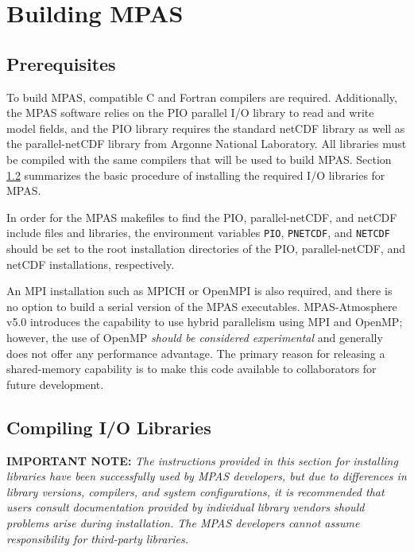 \chapter{Building MPAS}
\label{chap:mpas_build_instructions}

\section{Prerequisites}
\label{build_prerequisites}

To build MPAS, compatible C and Fortran compilers are required. Additionally,
the MPAS software relies on the PIO parallel I/O library to read and write model
fields, and the PIO library requires the standard netCDF library as well as the
parallel-netCDF library from Argonne National Laboratory. All libraries must be
compiled with the same compilers that will be used to build MPAS. Section
\ref{sec:build_io} summarizes the basic procedure of installing the required I/O
libraries for MPAS.

In order for the MPAS makefiles to find the PIO, parallel-netCDF, and netCDF
include files and libraries, the environment variables {\tt PIO}, {\tt PNETCDF},
and {\tt NETCDF} should be set to the root installation directories of the PIO,
parallel-netCDF, and netCDF installations, respectively. 

An MPI installation such as MPICH or OpenMPI is also required, and there is no
option to build a serial version of the MPAS executables. MPAS-Atmosphere v5.0
introduces the capability to use hybrid parallelism using MPI and OpenMP; however,
the use of OpenMP {\em should be considered experimental} and generally does not
offer any performance advantage. The primary reason for releasing a shared-memory
capability is to make this code available to collaborators for future development.


\section{Compiling I/O Libraries}
\label{sec:build_io}

{\bf IMPORTANT NOTE:} {\em The instructions provided in this section for
installing libraries have been successfully used by MPAS developers, but due to
differences in library versions, compilers, and system configurations, it is
recommended that users consult documentation provided by individual library
vendors should problems arise during installation. The MPAS developers cannot assume
responsibility for third-party libraries.} \vspace{12pt}

